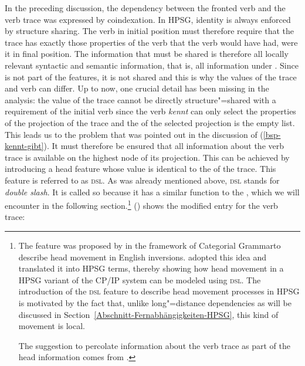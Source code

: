 \noindent
In the preceding discussion, the dependency between the fronted verb and the verb trace was expressed by coindexation. In HPSG, identity is always
enforced by structure sharing. The verb in initial position must therefore require that the trace
has exactly those properties of the verb that the verb would have had, were it in final
position. The information that must be shared is therefore all locally relevant syntactic and
semantic information, that is, all information under \local. Since \phon is not part of the \local features, it is not shared and this is why the \phon values of the trace and verb can
differ. Up to now, one crucial detail has been missing in the analysis: the \local value of the
trace cannot be directly structure"=shared with a requirement of the initial verb since the verb
\emph{kennt} can only select the properties of the projection of the trace and the \subcatl of the
selected projection is the empty list. This leads us to the problem that was pointed out in the
discussion of (\ref{bsp-kennt-gibt}). It must therefore be ensured that all information about the verb trace is available
on the highest node of its projection. This can be achieved by introducing a head feature whose
value is identical to the \localv of the trace. This feature is referred to as
\textsc{dsl}. As was already mentioned above, \textsc{dsl} stands for \emph{double
  slash}. It is called so because it has a similar function to the \slashf, which we will encounter in the following section.\footnote{
	The feature \dsl was proposed by \citet*{Jacobson87} in the framework of Categorial Grammar\indexcg to describe head movement in English
	inversions. \citet{Borsley89} adopted this idea and translated it into HPSG terms, thereby showing how head movement
	in a HPSG variant of the CP/IP system can be modeled using \textsc{dsl}.
	The introduction of the \textsc{dsl} feature to describe head movement processes in HPSG is
        motivated by the fact that, unlike long"=distance dependencies as will be discussed in Section~\ref{Abschnitt-Fernabhängigkeiten-HPSG}, this kind of movement is local.
	
	The suggestion to percolate information about the verb trace as part of the head information comes from \citet{Oliva92a}.%
}
() shows the modified entry for the verb trace:

